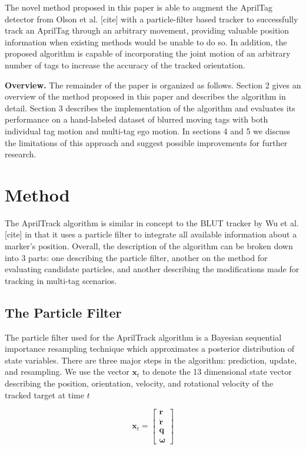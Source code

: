 \documentclass[letterpaper, 10 pt, conference]{ieeeconf}
\renewcommand{\vec}[1]{\boldsymbol{#1}}
\begin{document}
The novel method proposed in this paper is able to augment the AprilTag detector from Olson et al. [cite] with a particle-filter based tracker to successfully track an AprilTag through an arbitrary movement, providing valuable position information when existing methods would be unable to do so. In addition, the proposed algorithm is capable of incorporating the joint motion of an arbitrary number of tags to increase the accuracy of the tracked orientation.


\textbf{Overview.} The remainder of the paper is organized as follows. Section 2 gives an overview of the method proposed in this paper and describes the algorithm in detail. Section 3 describes the implementation of the algorithm and evaluates its performance on a hand-labeled dataset of blurred moving tags with both individual tag motion and multi-tag ego motion. In sections 4 and 5 we discuss the limitations of this approach and suggest possible improvements for further research.

\section{Method}

The AprilTrack algorithm is similar in concept to the BLUT tracker by Wu et al. [cite] in that it uses a particle filter to integrate all available information about a marker's position. Overall, the description of the algorithm can be broken down into 3 parts: one describing the particle filter, another on the method for evaluating candidate particles, and another describing the modifications made for tracking in multi-tag scenarios.

\subsection{The Particle Filter}

The particle filter used for the AprilTrack algorithm is a Bayesian sequential importance resampling technique which approximates a posterior distribution of state variables. There are three major steps in the algorithm: prediction, update, and resampling. We use the vector  $\vec{x}_t$  to denote the 13 dimensional state vector describing the position, orientation, velocity, and rotational velocity of the tracked target at time $t$ 

\begin{equation}
\vec{x}_t = 
\begin{bmatrix}
	\vec{r} \\
	\dot{\vec{r}} \\
	\vec{q} \\
	\vec{\omega}
\end{bmatrix}
\end{equation}
\end{document}
